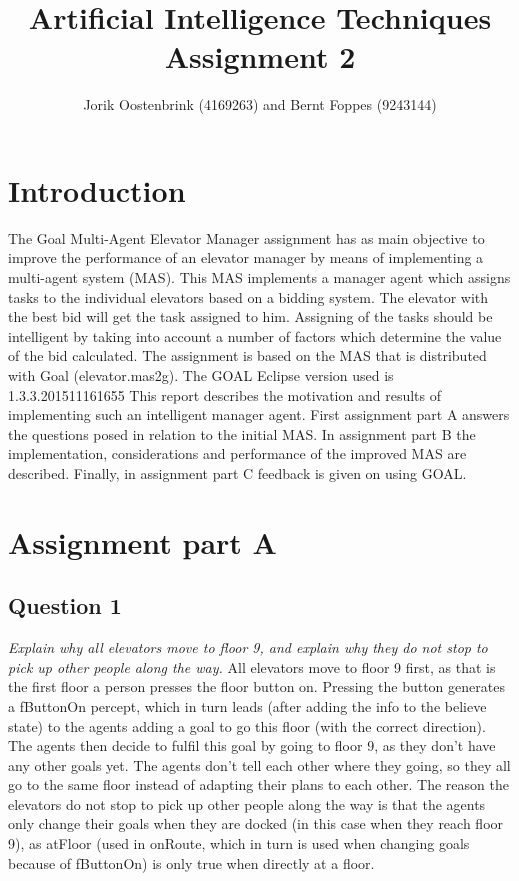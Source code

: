 \documentclass[a4paper,11pt]{article}
\title{Artificial Intelligence Techniques Assignment 2}
\author{Jorik Oostenbrink (4169263) and Bernt Foppes (9243144)}
\date{}
\begin{document}
\maketitle	

\section{Introduction}
The Goal Multi-Agent Elevator Manager assignment has as main objective to improve the performance of an elevator manager by means of implementing a multi-agent system (MAS). This MAS implements a manager agent which assigns tasks to the individual elevators based on a bidding system. The elevator with the best bid will get the task assigned to him. Assigning of the tasks should be intelligent by taking into account a number of factors which determine the value of the bid calculated. 
\newline\newline
The assignment is based on the MAS that is distributed with Goal (elevator.mas2g). The GOAL Eclipse version used is 1.3.3.201511161655  
\newline\newline
This report describes the motivation and results of implementing such an intelligent manager agent. First assignment part A answers the questions posed in relation to the initial MAS. In assignment part B the implementation, considerations and performance of the improved MAS are described. Finally, in assignment part C feedback is given on using GOAL. 

\section{Assignment part A}

\subsection{Question 1}
\textit{Explain why all elevators move to floor 9, and explain why they do not stop to pick up other people along the way.}
\newline\newline
All elevators move to floor 9 first, as that is the first floor a person presses the floor button on. Pressing the button generates a fButtonOn percept, which in turn leads (after adding the info to the believe state) to the agents adding a goal to go this floor (with the correct direction). The agents then decide to fulfil this goal by going to floor 9, as they don't have any other goals yet. The agents don't tell each other where they going, so they all go to the same floor instead of adapting their plans to each other.
\newline\newline
The reason the elevators do not stop to pick up other people along the way is that the agents only change their goals when they are docked (in this case when they reach floor 9), as atFloor (used in onRoute, which in turn is used when changing goals because of fButtonOn) is only true when directly at a floor.
\end{document}
